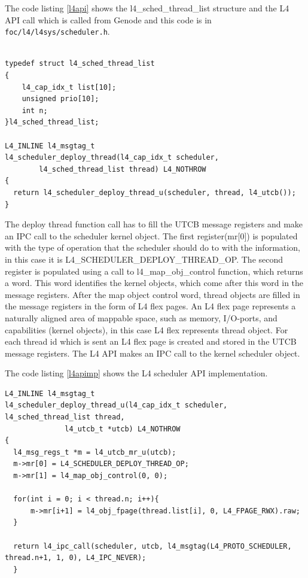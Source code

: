 The code listing  \ref{l4api} shows the l4\_sched\_thread\_list structure and the L4 API call which is called from Genode and this code is in \texttt{foc/l4/l4sys/scheduler.h}.
\begin{lstlisting}[caption={L4 scheduler API in scheduler.h},label={l4api}, style=customcpp]

typedef struct l4_sched_thread_list
{
	l4_cap_idx_t list[10];
	unsigned prio[10];
	int n;
}l4_sched_thread_list;

L4_INLINE l4_msgtag_t
l4_scheduler_deploy_thread(l4_cap_idx_t scheduler,
		l4_sched_thread_list thread) L4_NOTHROW
{
  return l4_scheduler_deploy_thread_u(scheduler, thread, l4_utcb());
}
\end{lstlisting}

The deploy thread function call has to fill the UTCB message registers and make an IPC call to the scheduler kernel object. The first register(mr[0]) is populated with the type of operation that the scheduler should do to with the information, in this case it is L4\_SCHEDULER\_DEPLOY\_THREAD\_OP. The second register is populated using a call to l4\_map\_obj\_control function, which returns a word. This word identifies the kernel objects, which come after this word in the message registers. After the map object control word, thread objects are filled in the message registers in the form of L4 flex pages. An L4 flex page represents a naturally aligned area of mappable space, such as memory, I/O-ports, and capabilities (kernel objects), in this case L4 flex represents thread object.
For each thread id which is sent an L4 flex page is created and stored in the UTCB message registers. The L4 API makes an IPC call to the kernel scheduler object. 

The code listing \ref{l4apimp} shows the L4 scheduler API implementation.

\begin{lstlisting}[caption={L4 scheduler API implementation},label={l4apimp}, style=customcpp]
L4_INLINE l4_msgtag_t
l4_scheduler_deploy_thread_u(l4_cap_idx_t scheduler, l4_sched_thread_list thread,
			  l4_utcb_t *utcb) L4_NOTHROW
{
  l4_msg_regs_t *m = l4_utcb_mr_u(utcb);
  m->mr[0] = L4_SCHEDULER_DEPLOY_THREAD_OP;
  m->mr[1] = l4_map_obj_control(0, 0);

  for(int i = 0; i < thread.n; i++){
	  m->mr[i+1] = l4_obj_fpage(thread.list[i], 0, L4_FPAGE_RWX).raw;
  }
  
  return l4_ipc_call(scheduler, utcb, l4_msgtag(L4_PROTO_SCHEDULER, thread.n+1, 1, 0), L4_IPC_NEVER);
  }
\end{lstlisting}
  
